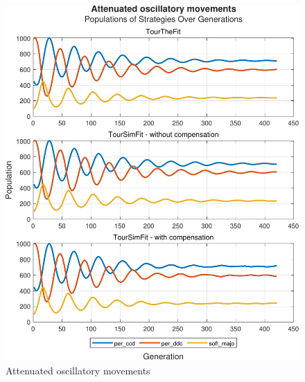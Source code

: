 \documentclass[12pt]{article}
\begin{document}
	\begin{figure}[h]
	      \centering
	      \includegraphics[scale=0.8]{Attenuated oscillatory movements.pdf}
	      \caption{Attenuated oscillatory movements}
	      \label{fig:Attenuated oscillatory movements}
	\end{figure}
\end{document}
